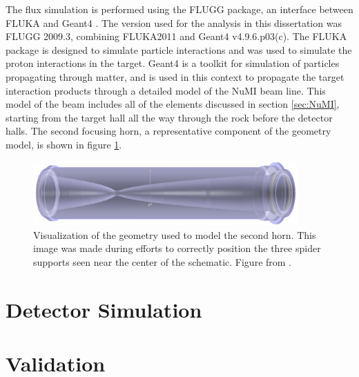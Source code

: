 The flux simulation is performed using the FLUGG package, an interface between FLUKA \cite{ref:Fluka1, ref:Fluka2} and Geant4 \cite{ref:Geant41, ref:Geant42}. The version used for the analysis in this dissertation was FLUGG 2009.3, combining FLUKA2011 and Geant4 v4.9.6.p03(c). The FLUKA package is designed to simulate particle interactions and was used to simulate the proton interactions in the target. Geant4 is a toolkit for simulation of particles propagating through matter, and is used in this context to propagate the target interaction products through a detailed model of the NuMI beam line. This model of the beam includes all of the elements discussed in section \ref{sec:NuMI}, starting from the target hall all the way through the rock before the detector halls. The second focusing horn, a representative component of the geometry model, is shown in figure \ref{fig:GeomHorn}.
\begin{figure}[htb]
  \centering
  \includegraphics[width=0.9\textwidth]{figures/Horn2.png}
  \caption[Model of the Second Focusing Horn]{Visualization of the geometry used to model the second horn. This image was made during efforts to correctly position the three spider supports seen near the center of the schematic. Figure from \cite{ref:GeomNuMI}.}
  \label{fig:GeomHorn}
\end{figure}

\section{Detector Simulation}

\section{Validation}